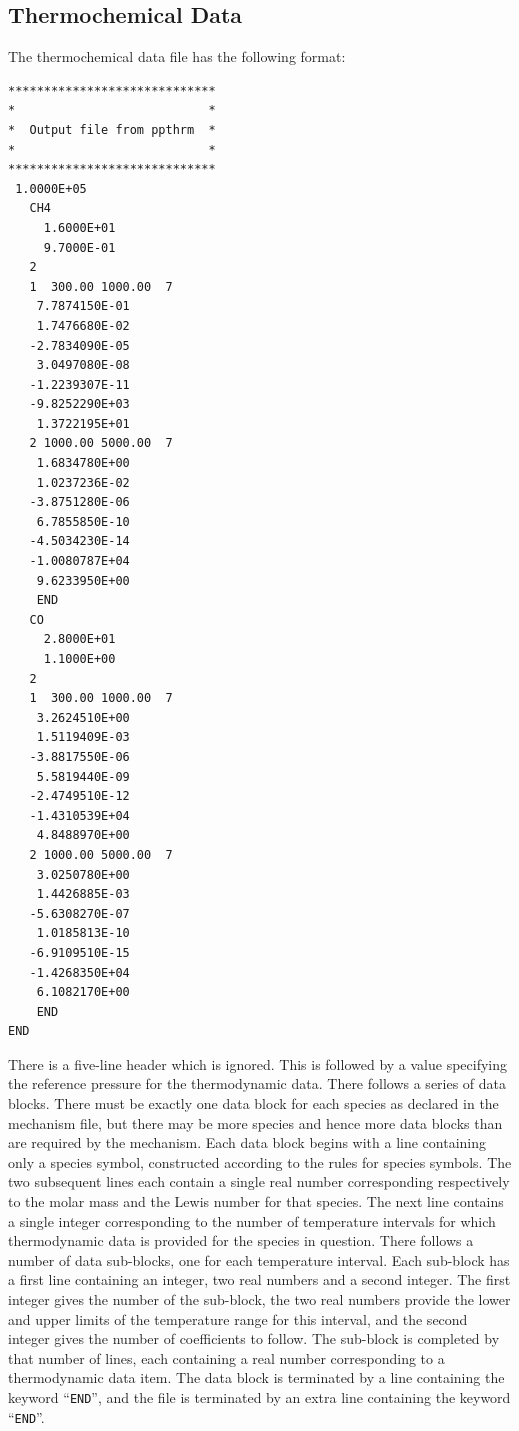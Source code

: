 \documentclass[dvips]{article}
\begin{document}
\subsection{Thermochemical Data}
The thermochemical data file has the following format:
\begin{verbatim}
*****************************
*                           *
*  Output file from ppthrm  *
*                           *
*****************************
 1.0000E+05
   CH4
     1.6000E+01
     9.7000E-01
   2
   1  300.00 1000.00  7
    7.7874150E-01
    1.7476680E-02
   -2.7834090E-05
    3.0497080E-08
   -1.2239307E-11
   -9.8252290E+03
    1.3722195E+01
   2 1000.00 5000.00  7
    1.6834780E+00
    1.0237236E-02
   -3.8751280E-06
    6.7855850E-10
   -4.5034230E-14
   -1.0080787E+04
    9.6233950E+00
    END
   CO
     2.8000E+01
     1.1000E+00
   2
   1  300.00 1000.00  7
    3.2624510E+00
    1.5119409E-03
   -3.8817550E-06
    5.5819440E-09
   -2.4749510E-12
   -1.4310539E+04
    4.8488970E+00
   2 1000.00 5000.00  7
    3.0250780E+00
    1.4426885E-03
   -5.6308270E-07
    1.0185813E-10
   -6.9109510E-15
   -1.4268350E+04
    6.1082170E+00
    END
END
\end{verbatim}
There is a five-line header which is ignored.  This is followed by a
value specifying the reference pressure for the thermodynamic data.
There follows a series of data blocks.  There must be exactly one data block
for each species as declared in the mechanism file, but there may be
more species and hence more data blocks than are required by the
mechanism.
Each data block begins with a line containing only a species
symbol, constructed according to the rules for species symbols.  The two
subsequent lines each contain a single real number corresponding
respectively to the molar mass and the Lewis number for that species.
The next line contains a single integer corresponding to the number of
temperature intervals for which thermodynamic data is provided for the
species in question.  There follows a number of data sub-blocks, one for
each temperature interval.  Each sub-block has a first line containing
an integer, two real numbers and a second integer.  The first integer
gives the number of the sub-block, the two real numbers provide the lower and
upper limits of the temperature range for this interval, and the second
integer gives the number of coefficients to follow.  The sub-block is
completed by that number of lines, each containing a real number
corresponding to a thermodynamic data item.  The data block is terminated by a
line containing the keyword ``{\tt END}'', and the file is terminated by an
extra line containing the keyword ``{\tt END}''.  
\end{document}
